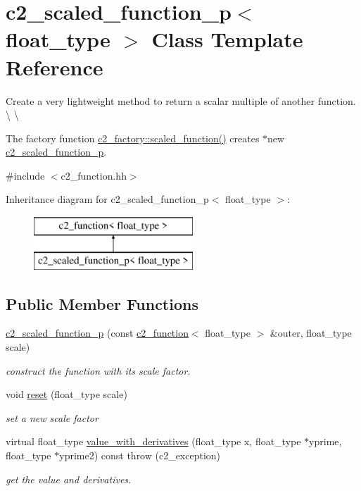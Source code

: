\hypertarget{classc2__scaled__function__p}{\section{c2\-\_\-scaled\-\_\-function\-\_\-p$<$ float\-\_\-type $>$ Class Template Reference}
\label{classc2__scaled__function__p}
}


Create a very lightweight method to return a scalar multiple of another function. \textbackslash{} \textbackslash{}

The factory function \hyperlink{classc2__factory_a81a7b686b7ffa389ad4dcd8d18997332}{c2\-\_\-factory\-::scaled\-\_\-function()} creates $\ast$new \hyperlink{classc2__scaled__function__p}{c2\-\_\-scaled\-\_\-function\-\_\-p}.  




{\ttfamily \#include $<$c2\-\_\-function.\-hh$>$}

Inheritance diagram for c2\-\_\-scaled\-\_\-function\-\_\-p$<$ float\-\_\-type $>$\-:\begin{figure}[H]
\begin{center}
\leavevmode
\includegraphics[height=2.000000cm]{classc2__scaled__function__p}
\end{center}
\end{figure}
\subsection*{Public Member Functions}
\begin{DoxyCompactItemize}
\item 
\hyperlink{classc2__scaled__function__p_a50fe165a75a9fb3597a227b8f028bebb}{c2\-\_\-scaled\-\_\-function\-\_\-p} (const \hyperlink{classc2__function}{c2\-\_\-function}$<$ float\-\_\-type $>$ \&outer, float\-\_\-type scale)
\begin{DoxyCompactList}\small\item\em construct the function with its scale factor. \end{DoxyCompactList}\item 
void \hyperlink{classc2__scaled__function__p_ab6a2af982a51bc321609a8cc91c7ff42}{reset} (float\-\_\-type scale)
\begin{DoxyCompactList}\small\item\em set a new scale factor \end{DoxyCompactList}\item 
virtual float\-\_\-type \hyperlink{classc2__scaled__function__p_a29f90a45574f413a18349e220287fb5d}{value\-\_\-with\-\_\-derivatives} (float\-\_\-type x, float\-\_\-type $\ast$yprime, float\-\_\-type $\ast$yprime2) const   throw (c2\-\_\-exception)
\begin{DoxyCompactList}\small\item\em get the value and derivatives. \end{DoxyCompactList}\end{DoxyCompactItemize}
